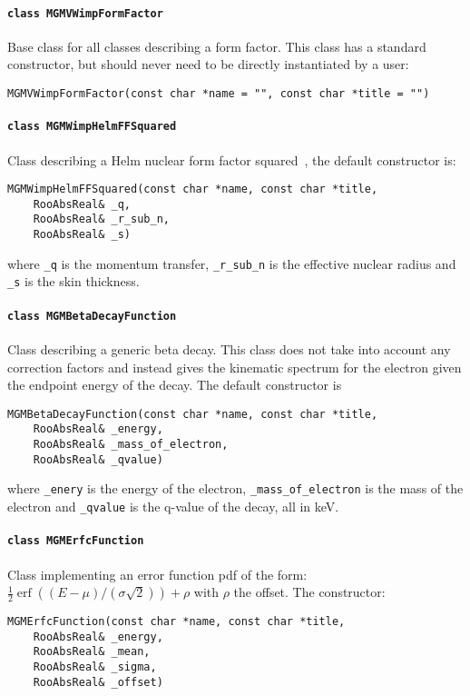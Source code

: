 			\paragraph{\lstinline!class MGMVWimpFormFactor!}
Base class for all classes describing a form factor.  This class has a standard constructor, but should never need to be directly
instantiated by a user: 
				\begin{lstlisting}
MGMVWimpFormFactor(const char *name = "", const char *title = "")
				\end{lstlisting}			
				
			\paragraph{\lstinline!class MGMWimpHelmFFSquared!}
Class describing a Helm nuclear form factor squared~\cite{Helm56}, the default constructor is: 
				\begin{lstlisting}
MGMWimpHelmFFSquared(const char *name, const char *title, 
	RooAbsReal& _q, 
	RooAbsReal& _r_sub_n, 
	RooAbsReal& _s)
				\end{lstlisting}
where \lstinline!_q! is the momentum transfer, \lstinline!_r_sub_n! is the effective nuclear radius and \lstinline!_s! is the skin thickness.
			
			\paragraph{\lstinline!class MGMBetaDecayFunction!}
Class describing a generic beta decay.  This class does not take into account any correction factors and instead gives the kinematic spectrum for the electron given the endpoint energy of the decay.  The default constructor is			
				\begin{lstlisting}
MGMBetaDecayFunction(const char *name, const char *title,
	RooAbsReal& _energy,
	RooAbsReal& _mass_of_electron,
	RooAbsReal& _qvalue)
				\end{lstlisting}	
where \lstinline!_enery! is the energy of the electron, \lstinline!_mass_of_electron! is the mass of the electron and  \lstinline!_qvalue! is the q-value of the decay, all in keV.

			\paragraph{\lstinline!class MGMErfcFunction!}
Class implementing an error function pdf of the form: $ \frac{1}{2}\operatorname{erf} ((E-\mu)/(\sigma \sqrt{2})) + \rho$ with $\rho$ the offset.  The constructor:
				\begin{lstlisting}
MGMErfcFunction(const char *name, const char *title,
	RooAbsReal& _energy,
	RooAbsReal& _mean,
	RooAbsReal& _sigma,
	RooAbsReal& _offset)
				\end{lstlisting}			
				
